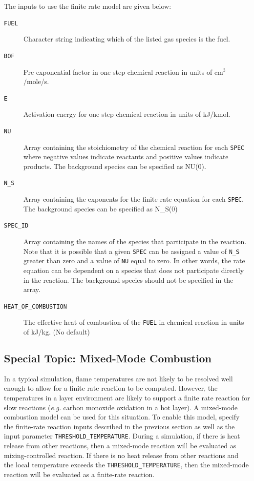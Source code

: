 \documentclass[11pt]{book}
\newcommand{\ct}{\tt\small}
\begin{document}
The inputs to use the finite rate model are given below:

\begin{description}
\item[{\ct FUEL}] Character string indicating which of the listed gas species is the fuel.
\item[{\ct BOF}] Pre-exponential factor in one-step chemical reaction in
units of cm$^3$/mole/s.
\item[{\ct E}] Activation energy for one-step chemical reaction in
units of kJ/kmol.
\item[{\ct NU}] Array containing the stoichiometry of the chemical reaction for each {\ct SPEC} where negative values indicate reactants and positive values indicate products.
The background species can be specified as NU(0).
\item[{\ct N\_S}] Array containing the exponents for the finite rate equation for each {\ct SPEC}. The background species can be specified as  N\_S(0)
\item[{\ct SPEC\_ID}] Array containing the names of the species that participate in the reaction. Note that it is possible that a given {\ct SPEC} can
be assigned a value of {\ct N\_S} greater than zero and a value of {\ct NU} equal to zero. In other words,
the rate equation can be dependent on a species that does not participate directly in the reaction.  The background species should not be specified in the array.
\item[{\ct HEAT\_OF\_COMBUSTION}] The effective heat of combustion of the {\ct FUEL} in chemical reaction in units of kJ/kg. (No default)
\end{description}





\subsection{Special Topic: Mixed-Mode Combustion}
\label{info:mixedmode}

In a typical simulation, flame temperatures are not likely to be resolved well enough to allow for a finite rate reaction to be computed.
However, the temperatures in a layer environment are likely to support a finite rate reaction for slow reactions ({\em e.g.} carbon monoxide oxidation in a hot layer).
A mixed-mode combustion model can be used for this situation.  To enable this model, specify the finite-rate reaction inputs described in the previous section
as well as the input parameter {\ct THRESHOLD\_TEMPERATURE}.  During a simulation, if there is heat release from other reactions,
then a mixed-mode reaction will be evaluated as mixing-controlled reaction.  If there is no heat release from other reactions and the local
temperature exceeds the {\ct THRESHOLD\_TEMPERATURE}, then the mixed-mode reaction will be evaluated as a finite-rate reaction.
\end{document}
